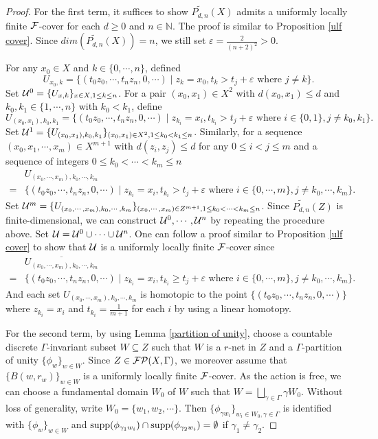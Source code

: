 \documentclass[11pt]{article}
\theoremstyle{definition}
\theoremstyle{plain}
\def\IN{\mathbb N}\def\IR{\mathbb R}\def\IE{\mathbb E}\def\IC{\mathbb C}\def\IL{\mathbb L}\def\IQ{\mathbb Q}\def\IA{\mathbb A}\def\IZ{\mathbb Z}
\def\MRdnZ{\widetilde{P_{d,n}}(Z)}
\def\MRdnX{\widetilde{P_{d,n}}(X)}
\def\supp{\textup{supp}}
\def\Ga{\Gamma}
\begin{document}
\begin{proof}
For the first term, it suffices to show $\MRdnX$ admits a uniformly locally finite $\mathcal F$-cover for each $d\geq 0$ and $n\in\IN$. The proof is similar to Proposition \ref{ulf cover}. Since $dim(\MRdnX)=n$, we still set $\varepsilon=\frac{2}{(n+2)^2}>0$.

For any $x_0\in X$ and $k\in\{0,\cdots,n\}$, defined
$$U_{x_0,k}=\{(t_0z_0,\cdots,t_nz_n,0,\cdots)\mid z_k=x_0, t_k>t_j+\varepsilon\text{ where }j\ne k\}.$$
Set $\mathcal U^0=\{U_{x,k}\}_{x\in X,1\leq k\leq n}$. For a pair $(x_0,x_1)\in X^2$ with $d(x_0,x_1)\leq d$ and $k_0,k_1\in\{1,\cdots,n\}$ with $k_0< k_1$, define
$$U_{(x_0,x_1),k_0,k_1}=\{(t_0z_0,\cdots,t_nz_n,0,\cdots)\mid z_{k_i}=x_i, t_{k_i}>t_j+\varepsilon\text{ where }i\in\{0,1\},j\ne k_0,k_1\}.$$
Set $\mathcal U^1=\{U_{(x_0,x_1),k_0,k_1}\}_{(x_0,x_1)\in X^2,1\leq k_0<k_1\leq n}$. Similarly, for a sequence $(x_0,x_1,\cdots,x_m)\in X^{m+1}$ with $d(z_i,z_j)\leq d$ for any $0\leq i<j\leq m$ and a sequence of integers $0\leq k_0<\cdots<k_m\leq n$
\[\begin{split}&U_{(x_0,\cdots,x_m),k_0,\cdots,k_m}\\
=&\{(t_0z_0,\cdots,t_nz_n,0,\cdots)\mid z_{k_i}=x_i, t_{k_i}>t_j+\varepsilon\text{ where }i\in\{0,\cdots,m\},j\ne k_0,\cdots,k_m\}.\end{split}\]
Set $\mathcal U^m=\{U_{(x_0,\cdots,x_m),k_0,\cdots,k_m}\}_{(x_0,\cdots,x_m)\in Z^{m+1},1\leq k_0<\cdots<k_m\leq n}$. Since $\MRdnZ$ is finite-dimensional, we can construct $\mathcal U^0,\cdots,\mathcal U^n$ by repeating the procedure above. Set $\mathcal U=\mathcal U^0\cup\cdots\cup\mathcal U^n$. One can follow a proof similar to Proposition \ref{ulf cover} to show that $\mathcal U$ is a uniformly locally finite $\mathcal F$-cover since
\[\begin{split}&\overline{U_{(x_0,\cdots,x_m),k_0,\cdots,k_m}}\\
=&\{(t_0z_0,\cdots,t_nz_n,0,\cdots)\mid z_{k_i}=x_i, t_{k_i}\geq t_j+\varepsilon\text{ where }i\in\{0,\cdots,m\},j\ne k_0,\cdots,k_m\}.\end{split}\]
And each set $U_{(x_0,\cdots,x_m),k_0,\cdots,k_m}$ is homotopic to the point $\{(t_0z_0,\cdots,t_nz_n,0,\cdots)\}$ where $z_{k_i}=x_i$ and $t_{k_i}=\frac 1{m+1}$ for each $i$ by using a linear homotopy.

For the second term, by using Lemma \ref{partition of unity}, choose a countable discrete $\Ga$-invariant subset $W\subseteq Z$ such that $W$ is a $r$-net in $Z$ and a $\Ga$-partition of unity $\{\phi_w\}_{w\in W}$. Since $Z\in\F\P(X,\Ga)$, we moreover assume that $\{B(w,r_w)\}_{w\in W}$ is a uniformly locally finite $\mathcal F$-cover. As the action is free, we can choose a fundamental domain $W_0$ of $W$ such that $W=\bigsqcup_{\gamma\in\Ga}\gamma W_0$. Without loss of generality, write $W_0=\{w_1,w_2,\cdots\}$. Then $\{\phi_{\gamma w_i}\}_{w_i\in W_0,\gamma\in\Ga}$ is identified with $\{\phi_w\}_{w\in W}$ and $\supp(\phi_{\gamma_1w_i})\cap\supp(\phi_{\gamma_2w_i})=\emptyset$ if $\gamma_1\ne\gamma_2$.


\end{proof}
\end{document}
